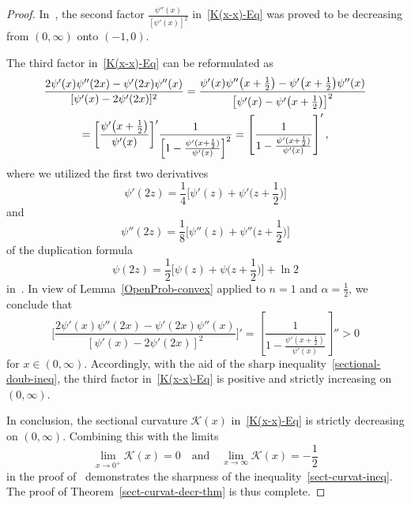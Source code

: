 \documentclass[reqno]{amsart}%
\theoremstyle{plain}
\theoremstyle{remark}
\begin{document}
\begin{proof}
In~\cite[Theorem~3.2]{RIMA-D-20-01130.tex}, the second factor $\frac{\psi''(x)}{[\psi'(x)]^2}$ in~\eqref{K(x-x)-Eq} was proved to be decreasing from $(0,\infty)$ onto $(-1,0)$.
\par
The third factor in~\eqref{K(x-x)-Eq} can be reformulated as
\begin{multline*}
\frac{2\psi'(x)\psi''(2x)-\psi'(2x)\psi''(x)}{[\psi'(x)-2\psi'(2x)]^2}
=\frac{\psi'(x)\psi''\bigl(x+\frac{1}{2}\bigr) -\psi'\bigl(x+\frac{1}{2}\bigr)\psi''(x)} {\bigl[\psi'(x)-\psi'\bigl(x+\frac{1}{2}\bigr)\bigr]^2}\\
=\biggl[\frac{\psi'\bigl(x+\frac12\bigr)}{\psi'(x)}\biggr]' \frac{1}{\Bigl[1-\frac{\psi'(x+\frac{1}{2})}{\psi'(x)}\Bigr]^2}
=\left[\frac{1}{1-\frac{\psi'(x+\frac{1}{2})}{\psi'(x)}}\right]',
\end{multline*}
where we utilized the first two derivatives
\begin{equation*}%
\psi'(2z)=\frac{1}{4}\biggl[\psi'(z)+\psi'\biggl(z+\frac{1}{2}\biggr)\biggr]
\end{equation*}
and
\begin{equation*}%
\psi''(2z)=\frac{1}{8}\biggl[\psi''(z)+\psi''\biggl(z+\frac{1}{2}\biggr)\biggr]
\end{equation*}
of the duplication formula
\begin{equation*}
\psi(2z)=\frac{1}{2}\biggl[\psi(z)+\psi\biggl(z+\frac{1}{2}\biggr)\biggr]+\ln2
\end{equation*}
in~\cite[p.~259, 6.3.8]{abram}. In view of Lemma~\ref{OpenProb-convex} applied to $n=1$ and $\alpha=\frac{1}{2}$, we conclude that
\begin{equation*}
\biggl[\frac{2\psi'(x)\psi''(2x)-\psi'(2x)\psi''(x)}{[\psi'(x)-2\psi'(2x)]^2}\biggr]'
=\left[\frac{1}{1-\frac{\psi'(x+\frac{1}{2})}{\psi'(x)}}\right]''
>0
\end{equation*}
for $x\in(0,\infty)$. Accordingly, with the aid of the sharp inequality~\eqref{sectional-doub-ineq}, the third factor in~\eqref{K(x-x)-Eq} is positive and strictly increasing on $(0,\infty)$.
\par
In conclusion, the sectional curvature $\mathcal{K}(x)$ in~\eqref{K(x-x)-Eq} is strictly decreasing on $(0,\infty)$. Combining this with the limits
\begin{equation*}
\lim_{x\to0^+}\mathcal{K}(x)=0 \quad\text{and}\quad \lim_{x\to\infty}\mathcal{K}(x)=-\frac{1}{2}
\end{equation*}
in the proof of~\cite[Theorem~5.1]{RIMA-D-20-01130.tex} demonstrates the sharpness of the inequality~\eqref{sect-curvat-ineq}. The proof of Theorem~\ref{sect-curvat-decr-thm} is thus complete.
\end{proof}
\end{document}
